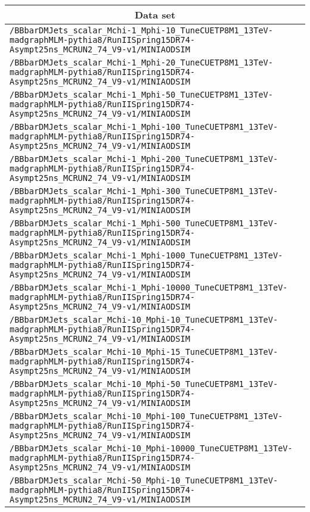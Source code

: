 \begin{center}
\begin{tabular}{l}
\hline\hline
\multicolumn{1}{c}{Data set}\tabularnewline
\hline
\verb!/BBbarDMJets_scalar_Mchi-1_Mphi-10_TuneCUETP8M1_13TeV-madgraphMLM-pythia8/RunIISpring15DR74-Asympt25ns_MCRUN2_74_V9-v1/MINIAODSIM! \tabularnewline
\verb!/BBbarDMJets_scalar_Mchi-1_Mphi-20_TuneCUETP8M1_13TeV-madgraphMLM-pythia8/RunIISpring15DR74-Asympt25ns_MCRUN2_74_V9-v1/MINIAODSIM! \tabularnewline
\verb!/BBbarDMJets_scalar_Mchi-1_Mphi-50_TuneCUETP8M1_13TeV-madgraphMLM-pythia8/RunIISpring15DR74-Asympt25ns_MCRUN2_74_V9-v1/MINIAODSIM! \tabularnewline
\verb!/BBbarDMJets_scalar_Mchi-1_Mphi-100_TuneCUETP8M1_13TeV-madgraphMLM-pythia8/RunIISpring15DR74-Asympt25ns_MCRUN2_74_V9-v1/MINIAODSIM! \tabularnewline
\verb!/BBbarDMJets_scalar_Mchi-1_Mphi-200_TuneCUETP8M1_13TeV-madgraphMLM-pythia8/RunIISpring15DR74-Asympt25ns_MCRUN2_74_V9-v1/MINIAODSIM! \tabularnewline
\verb!/BBbarDMJets_scalar_Mchi-1_Mphi-300_TuneCUETP8M1_13TeV-madgraphMLM-pythia8/RunIISpring15DR74-Asympt25ns_MCRUN2_74_V9-v1/MINIAODSIM! \tabularnewline
\verb!/BBbarDMJets_scalar_Mchi-1_Mphi-500_TuneCUETP8M1_13TeV-madgraphMLM-pythia8/RunIISpring15DR74-Asympt25ns_MCRUN2_74_V9-v1/MINIAODSIM! \tabularnewline
\verb!/BBbarDMJets_scalar_Mchi-1_Mphi-1000_TuneCUETP8M1_13TeV-madgraphMLM-pythia8/RunIISpring15DR74-Asympt25ns_MCRUN2_74_V9-v1/MINIAODSIM! \tabularnewline
\verb!/BBbarDMJets_scalar_Mchi-1_Mphi-10000_TuneCUETP8M1_13TeV-madgraphMLM-pythia8/RunIISpring15DR74-Asympt25ns_MCRUN2_74_V9-v1/MINIAODSIM! \tabularnewline
\verb!/BBbarDMJets_scalar_Mchi-10_Mphi-10_TuneCUETP8M1_13TeV-madgraphMLM-pythia8/RunIISpring15DR74-Asympt25ns_MCRUN2_74_V9-v1/MINIAODSIM! \tabularnewline
\verb!/BBbarDMJets_scalar_Mchi-10_Mphi-15_TuneCUETP8M1_13TeV-madgraphMLM-pythia8/RunIISpring15DR74-Asympt25ns_MCRUN2_74_V9-v1/MINIAODSIM! \tabularnewline
\verb!/BBbarDMJets_scalar_Mchi-10_Mphi-50_TuneCUETP8M1_13TeV-madgraphMLM-pythia8/RunIISpring15DR74-Asympt25ns_MCRUN2_74_V9-v1/MINIAODSIM! \tabularnewline
\verb!/BBbarDMJets_scalar_Mchi-10_Mphi-100_TuneCUETP8M1_13TeV-madgraphMLM-pythia8/RunIISpring15DR74-Asympt25ns_MCRUN2_74_V9-v1/MINIAODSIM! \tabularnewline
\verb!/BBbarDMJets_scalar_Mchi-10_Mphi-10000_TuneCUETP8M1_13TeV-madgraphMLM-pythia8/RunIISpring15DR74-Asympt25ns_MCRUN2_74_V9-v1/MINIAODSIM! \tabularnewline
\verb!/BBbarDMJets_scalar_Mchi-50_Mphi-10_TuneCUETP8M1_13TeV-madgraphMLM-pythia8/RunIISpring15DR74-Asympt25ns_MCRUN2_74_V9-v1/MINIAODSIM! \tabularnewline

\end{tabular}
\end{center}
